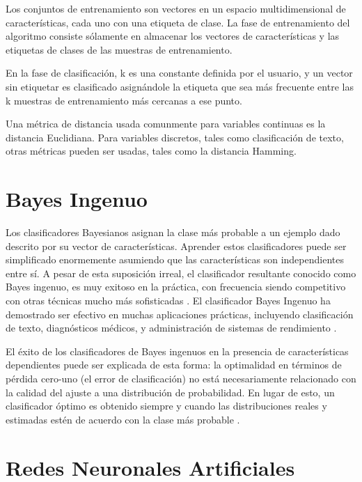 Los conjuntos de entrenamiento son vectores en un espacio
multidimensional de características, cada uno con una etiqueta de
clase. La fase de entrenamiento del algoritmo consiste sólamente en
almacenar los vectores de características y las etiquetas de clases de
las muestras de entrenamiento.

En la fase de clasificación, k es una constante definida por el
usuario, y un vector sin etiquetar es clasificado asignándole la
etiqueta que sea más frecuente entre las k muestras de entrenamiento
más cercanas a ese punto.

Una métrica de distancia usada comunmente para variables continuas es
la distancia Euclidiana. Para variables discretos, tales como
clasificación de texto, otras métricas pueden ser usadas, tales como
la distancia Hamming.

\section{Bayes Ingenuo}
\label{naive}

Los clasificadores Bayesianos asignan la clase más probable a un
ejemplo dado descrito por su vector de características. Aprender estos
clasificadores puede ser simplificado enormemente asumiendo que las
características son independientes entre sí. A pesar de esta
suposición irreal, el clasificador resultante conocido como Bayes
ingenuo, es muy exitoso en la práctica, con frecuencia siendo
competitivo con otras técnicas mucho más sofisticadas
\cite{hilden1984statistical} \cite{langley1992analysis}
\cite{friedman1997bayesian} \cite{domingos1997optimality}. El
clasificador Bayes Ingenuo ha demostrado ser efectivo en muchas
aplicaciones prácticas, incluyendo clasificación de texto,
diagnósticos médicos, y administración de sistemas de rendimiento
\cite{domingos1997optimality} \cite{mitchell1997machine}
\cite{hellerstein2000recognizing}.

El éxito de los clasificadores de Bayes ingenuos en la presencia de
características dependientes puede ser explicada de esta forma: la
optimalidad en términos de pérdida cero-uno (el error de
clasificación) no está necesariamente relacionado con la calidad del
ajuste a una distribución de probabilidad. En lugar de esto, un
clasificador óptimo es obtenido siempre y cuando las distribuciones
reales y estimadas estén de acuerdo con la clase más probable
\cite{domingos1997optimality}.


\section{Redes Neuronales Artificiales}
\label{ann}

